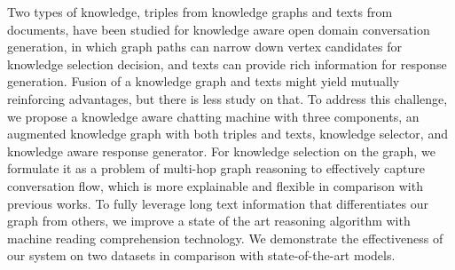 Two types of knowledge, triples from knowledge graphs and texts from documents, have been studied for knowledge aware open domain conversation generation, in which graph paths can narrow down vertex candidates for knowledge selection decision, and texts can provide rich information for response generation. Fusion of a knowledge graph and texts might yield mutually reinforcing advantages, but there is less study on that. To address this challenge, we propose a knowledge aware chatting machine with three components, an augmented knowledge graph with both triples and texts, knowledge selector, and knowledge aware response generator. For knowledge selection on the graph, we formulate it as a problem of multi-hop graph reasoning to effectively capture conversation ﬂow, which is more explainable and ﬂexible in comparison with previous works. To fully leverage long text information that differentiates our graph from others, we improve a state of the art reasoning algorithm with machine reading comprehension technology. We demonstrate the effectiveness of our system on two datasets in comparison with state-of-the-art models.